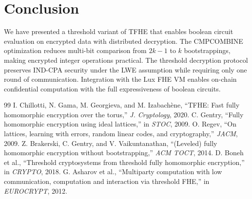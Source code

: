 \section{Conclusion}

\label{sec:conclusion}

We have presented a threshold variant of TFHE that enables boolean circuit evaluation
on encrypted data with distributed decryption. The CMPCOMBINE optimization reduces
multi-bit comparison from $2k-1$ to $k$ bootstrappings, making encrypted integer
operations practical. The threshold decryption protocol preserves IND-CPA security
under the LWE assumption while requiring only one round of communication. Integration
with the Lux FHE VM enables on-chain confidential computation with the full
expressiveness of boolean circuits.

\begin{thebibliography}{99}
 I. Chillotti, N. Gama, M. Georgieva, and M. Izabach\`ene, ``TFHE: Fast fully homomorphic encryption over the torus,'' \emph{J. Cryptology}, 2020.
 C. Gentry, ``Fully homomorphic encryption using ideal lattices,'' in \emph{STOC}, 2009.
 O. Regev, ``On lattices, learning with errors, random linear codes, and cryptography,'' \emph{JACM}, 2009.
 Z. Brakerski, C. Gentry, and V. Vaikuntanathan, ``(Leveled) fully homomorphic encryption without bootstrapping,'' \emph{ACM TOCT}, 2014.
 D. Boneh et al., ``Threshold cryptosystems from threshold fully homomorphic encryption,'' in \emph{CRYPTO}, 2018.
 G. Asharov et al., ``Multiparty computation with low communication, computation and interaction via threshold FHE,'' in \emph{EUROCRYPT}, 2012.
\end{thebibliography}

